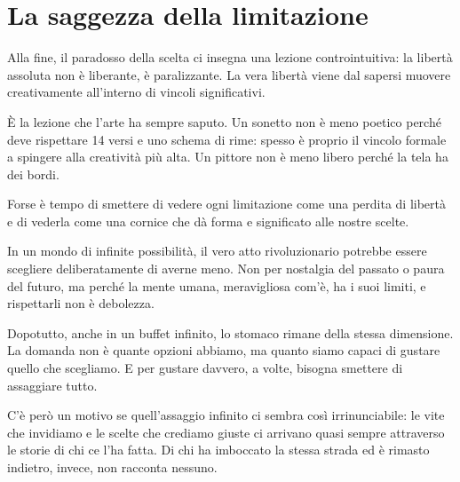 \section{La saggezza della limitazione}

Alla fine, il paradosso della scelta ci insegna una lezione controintuitiva: la libertà assoluta non è liberante, è paralizzante. La vera libertà viene dal sapersi muovere creativamente all'interno di vincoli significativi.

È la lezione che l'arte ha sempre saputo. Un sonetto non è meno poetico perché deve rispettare 14 versi e uno schema di rime: spesso è proprio il vincolo formale a spingere alla creatività più alta. Un pittore non è meno libero perché la tela ha dei bordi.

Forse è tempo di smettere di vedere ogni limitazione come una perdita di libertà e di vederla come una cornice che dà forma e significato alle nostre scelte.

In un mondo di infinite possibilità, il vero atto rivoluzionario potrebbe essere scegliere deliberatamente di averne meno. Non per nostalgia del passato o paura del futuro, ma perché la mente umana, meravigliosa com'è, ha i suoi limiti, e rispettarli non è debolezza.

\bigskip

Dopotutto, anche in un buffet infinito, lo stomaco rimane della stessa dimensione. La domanda non è quante opzioni abbiamo, ma quanto siamo capaci di gustare quello che scegliamo. E per gustare davvero, a volte, bisogna smettere di assaggiare tutto.

C'è però un motivo se quell'assaggio infinito ci sembra così irrinunciabile: le vite che invidiamo e le scelte che crediamo giuste ci arrivano quasi sempre attraverso le storie di chi ce l'ha fatta. Di chi ha imboccato la stessa strada ed è rimasto indietro, invece, non racconta nessuno.
